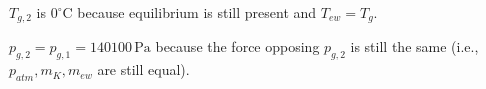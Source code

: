 \( T_{g,2} \) is \( 0^\circ \text{C} \) because equilibrium is still present and \( T_{ew} = T_{g} \).  

\( p_{g,2} = p_{g,1} = 140100 \, \text{Pa} \) because the force opposing \( p_{g,2} \) is still the same (i.e., \( p_{atm}, m_K, m_{ew} \) are still equal).